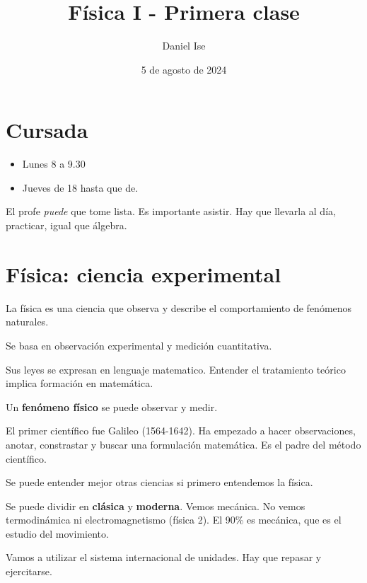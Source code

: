 \documentclass{article}
\title{Física I - Primera clase}
\author{Daniel Ise}
\date{5 de agosto de 2024}
\begin{document}
\maketitle

\section*{Cursada}
\begin{itemize}
    \item Lunes 8 a 9.30
    \item Jueves de 18 hasta que de.
\end{itemize}

El profe \textit{puede} que tome lista. Es importante
asistir. Hay que llevarla al día, practicar, igual que álgebra.

\section*{Física: ciencia experimental}

La física es una ciencia que observa y describe el comportamiento de fenómenos naturales.

Se basa en observación experimental y medición cuantitativa. 

Sus leyes se expresan en lenguaje matematico. Entender el tratamiento teórico
implica formación en matemática.

Un \textbf{fenómeno físico} se puede observar y medir. 

El primer científico fue Galileo (1564-1642). Ha empezado a hacer observaciones,
anotar, constrastar y buscar una formulación matemática. Es el padre del método
científico. 

Se puede entender mejor otras ciencias si primero entendemos la física. 

Se puede dividir en \textbf{clásica} y \textbf{moderna}. Vemos mecánica. No 
vemos termodinámica ni electromagnetismo (física 2). El 90\% es mecánica, que es
el estudio del movimiento. 

Vamos a utilizar el sistema internacional de unidades. Hay que repasar y ejercitarse.
\end{document}
